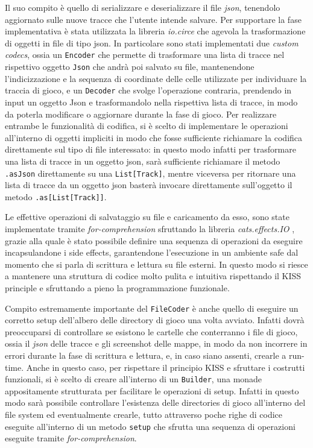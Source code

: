 Il suo compito è quello di serializzare e deserializzare il file \textit{json}, tenendolo aggiornato sulle nuove
tracce che l'utente intende salvare. Per supportare la fase implementativa è stata utilizzata la libreria \textit{io.circe}
\cite{circe} che agevola la trasformazione di oggetti in file di tipo json. In particolare sono stati implementati
due \textit{custom codecs}, ossia un \texttt{Encoder} che permette di trasformare una lista di tracce nel rispettivo
oggetto \texttt{Json} che andrà poi salvato su file, mantenendone l'indicizzazione e la sequenza di coordinate delle
celle utilizzate per individuare la traccia di gioco, e un \texttt{Decoder} che svolge l'operazione contraria,
prendendo in input un oggetto Json e trasformandolo nella rispettiva lista di tracce, in modo da poterla modificare o
aggiornare durante la fase di gioco. Per realizzare entrambe le funzionalità di codifica, si è scelto di implementare
le operazioni all'interno di oggetti impliciti in modo che fosse sufficiente richiamare la codifica direttamente sul
tipo di file interessato: in questo modo infatti per trasformare una lista di tracce in un oggetto json, sarà
sufficiente richiamare il metodo \texttt{.asJson} direttamente su una \texttt{List[Track]}, mentre viceversa per
ritornare una lista di tracce da un oggetto json basterà invocare direttamente sull'oggetto il metodo
\texttt{.as[List[Track]]}.



Le effettive operazioni di salvataggio su file e caricamento da esso, sono state implementate tramite
\textit{for-comprehension} sfruttando la libreria \textit{cats.effects.IO} \cite{cats-effects}, grazie alla quale è stato possibile
definire una sequenza di operazioni da eseguire incapsulandone i side effects, garantendone l'esecuzione in un
ambiente safe dal momento che si parla di scrittura e lettura su file esterni. In questo modo si riesce a mantenere
una struttura di codice molto pulita e intuitiva rispettando il KISS principle e sfruttando a pieno la programmazione
funzionale.

Compito estremamente importante del \texttt{FileCoder} è anche quello di eseguire un corretto setup dell'albero delle
directory di gioco una volta avviato. Infatti dovrà preoccuparsi di controllare se esistono le cartelle che
conterranno i file di gioco, ossia il \textit{json} delle tracce e gli screenshot delle mappe, in modo da non
incorrere in errori durante la fase di scrittura e lettura, e, in caso siano assenti, crearle a run-time. Anche in
questo caso, per rispettare il principio KISS e sfruttare i costrutti funzionali, si è scelto di creare all'interno
di un \texttt{Builder}, una monade appositamente strutturata per facilitare le operazioni di setup. Infatti in questo
modo sarà possibile controllare l'esistenza delle directories di gioco all'interno del file system ed eventualmente
crearle, tutto attraverso poche righe di codice eseguite all'interno di un metodo \texttt{setup} che sfrutta una
sequenza di operazioni eseguite tramite \textit{for-comprehension}.

